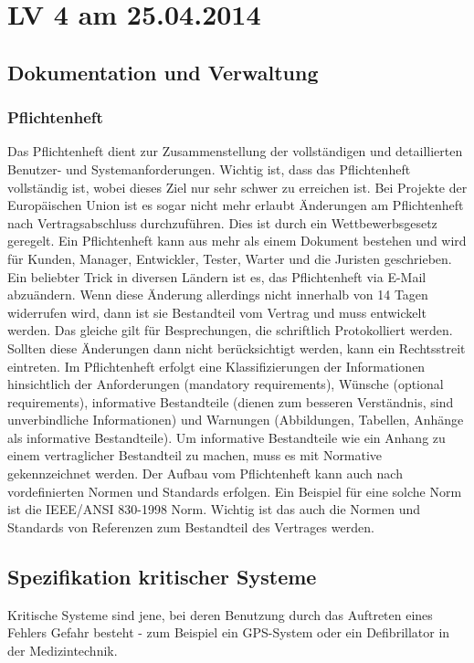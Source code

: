 \chapter{LV 4 am 25.04.2014}
\section{Dokumentation und Verwaltung}
\subsection{Pflichtenheft}
Das Pflichtenheft dient zur Zusammenstellung der vollständigen und detaillierten Benutzer- und Systemanforderungen. Wichtig ist, dass das Pflichtenheft vollständig ist, wobei dieses Ziel nur sehr schwer zu erreichen ist. Bei Projekte der Europäischen Union ist es sogar nicht mehr erlaubt Änderungen am Pflichtenheft nach Vertragsabschluss durchzuführen. Dies ist durch ein Wettbewerbsgesetz geregelt. 
\linebreak 
Ein Pflichtenheft kann aus mehr als einem Dokument bestehen und wird  für  Kunden, Manager, Entwickler, Tester, Warter und die Juristen geschrieben. 
\linebreak
Ein beliebter Trick in diversen Ländern ist es, das Pflichtenheft via E-Mail abzuändern. Wenn diese Änderung allerdings nicht innerhalb von 14 Tagen widerrufen wird, dann ist sie Bestandteil vom Vertrag und muss entwickelt werden. Das gleiche gilt für Besprechungen, die schriftlich Protokolliert werden. Sollten diese Änderungen dann nicht berücksichtigt werden, kann ein Rechtsstreit eintreten.
\linebreak
Im Pflichtenheft erfolgt eine Klassifizierungen der Informationen hinsichtlich der Anforderungen (mandatory requirements), Wünsche (optional requirements), informative Bestandteile (dienen zum besseren Verständnis, sind unverbindliche Informationen) und Warnungen (Abbildungen, Tabellen, Anhänge als informative Bestandteile). Um informative Bestandteile wie ein Anhang zu einem vertraglicher Bestandteil zu machen, muss es mit Normative gekennzeichnet werden.
\linebreak
Der Aufbau vom Pflichtenheft kann auch nach vordefinierten Normen und Standards erfolgen. Ein Beispiel für eine solche Norm ist die IEEE/ANSI 830-1998 Norm. Wichtig ist das auch die Normen und Standards von Referenzen zum Bestandteil des Vertrages werden.

\section{Spezifikation kritischer Systeme}
Kritische Systeme sind jene, bei deren Benutzung durch das Auftreten eines Fehlers Gefahr besteht - zum Beispiel ein GPS-System oder ein Defibrillator in der Medizintechnik.

